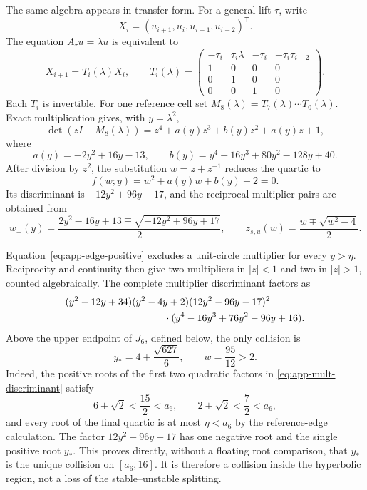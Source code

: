 The same algebra appears in transfer form.  For a general lift \(\tau\),
write
\[
 X_i=(u_{i+1},u_i,u_{i-1},u_{i-2})^{\mathsf T}.
\]
The equation \(A_\tau u=\lambda u\) is equivalent to
\begin{equation}
 X_{i+1}=T_i(\lambda)X_i,
 \qquad
 T_i(\lambda)=
 \begin{pmatrix}
 -\tau_i&\tau_i\lambda&-\tau_i&-\tau_i\tau_{i-2}\\
 1&0&0&0\\0&1&0&0\\0&0&1&0
 \end{pmatrix}.                       \label{eq:app-step-transfer}
\end{equation}
Each \(T_i\) is invertible.  For one reference cell set
\(M_8(\lambda)=T_7(\lambda)\cdots T_0(\lambda)\).  Exact multiplication
gives, with \(y=\lambda^2\),
\begin{equation}
 \det(zI-M_8(\lambda))
 =z^4+a(y)z^3+b(y)z^2+a(y)z+1,         \label{eq:app-palindromic}
\end{equation}
where
\begin{equation}
 a(y)=-2y^2+16y-13,\qquad
 b(y)=y^4-16y^3+80y^2-128y+40.         \label{eq:app-ab}
\end{equation}
After division by \(z^2\), the substitution \(w=z+z^{-1}\) reduces the
quartic to
\begin{equation}
 f(w;y)=w^2+a(y)w+b(y)-2=0.             \label{eq:app-w-quadratic}
\end{equation}
Its discriminant is \(-12y^2+96y+17\), and the reciprocal multiplier pairs
are obtained from
\begin{equation}
 w_\mp(y)=\frac{2y^2-16y+13
 \mp\sqrt{-12y^2+96y+17}}2,\qquad
 z_{s,u}(w)=\frac{w\mp\sqrt{w^2-4}}2.  \label{eq:app-multipliers}
\end{equation}

Equation~\eqref{eq:app-edge-positive} excludes a unit-circle multiplier for
every \(y>\eta\).  Reciprocity and continuity then give two multipliers in
\(|z|<1\) and two in \(|z|>1\), counted algebraically.  The complete
multiplier discriminant factors as
\begin{align}
 &(y^2-12y+34)(y^2-4y+2)(12y^2-96y-17)^2 \notag\\
 &\hspace{35mm}{}\cdot
 (y^4-16y^3+76y^2-96y+16).              \label{eq:app-mult-discriminant}
\end{align}
Above the upper endpoint of \(J_6\), defined below, the only collision is
\begin{equation}
 y_*=4+\frac{\sqrt{627}}6,\qquad w=\frac{95}{12}>2.  \label{eq:app-repeat}
\end{equation}
Indeed, the positive roots of the first two quadratic factors in
\eqref{eq:app-mult-discriminant} satisfy
\[
6+\sqrt2<\frac{15}{2}<a_6,\qquad
2+\sqrt2<\frac72<a_6,
\]
and every root of the final quartic is at most \(\eta<a_6\) by the
reference-edge calculation.  The factor \(12y^2-96y-17\) has one negative
root and the single positive root \(y_*\).  This proves directly, without a
floating root comparison, that \(y_*\) is the unique collision on
\([a_6,16]\).
It is therefore a collision inside the hyperbolic region, not a loss of the
stable--unstable splitting.

